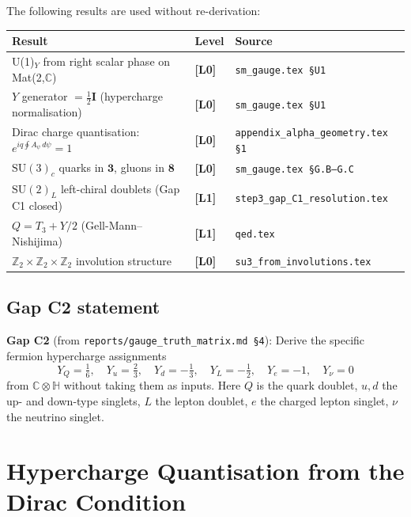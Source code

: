 \documentclass[12pt,a4paper]{article}
\theoremstyle{definition}
\theoremstyle{remark}
\newcommand{\Lzero}{\textbf{[L0]}}
\newcommand{\Lone}{\textbf{[L1]}}
\newcommand{\CC}{\mathbb{C}}
\newcommand{\HH}{\mathbb{H}}
\newcommand{\ZZ}{\mathbb{Z}}
\begin{document}
The following results are used without re-derivation:

\begin{tcolorbox}[colback=green!5!white,colframe=green!50!black,
  title={Pre-Proved Results}]
\begin{center}
\begin{tabular}{lll}
\toprule
\textbf{Result} & \textbf{Level} & \textbf{Source} \\
\midrule
U(1)$_Y$ from right scalar phase on Mat(2,$\CC$) & \Lzero &
  \texttt{sm\_gauge.tex §U1} \\
$Y$ generator $= \frac{1}{2}\mathbf{I}$ (hypercharge normalisation) & \Lzero &
  \texttt{sm\_gauge.tex §U1} \\
Dirac charge quantisation: $e^{iq\oint A_\psi\,d\psi} = 1$ & \Lzero &
  \texttt{appendix\_alpha\_geometry.tex §1} \\
$\mathrm{SU}(3)_c$ quarks in $\mathbf{3}$, gluons in $\mathbf{8}$ & \Lzero &
  \texttt{sm\_gauge.tex §G.B--G.C} \\
$\mathrm{SU}(2)_L$ left-chiral doublets (Gap C1 closed) & \Lone &
  \texttt{step3\_gap\_C1\_resolution.tex} \\
$Q = T_3 + Y/2$ (Gell-Mann--Nishijima) & \Lone &
  \texttt{qed.tex} \\
$\ZZ_2\times\ZZ_2\times\ZZ_2$ involution structure & \Lzero &
  \texttt{su3\_from\_involutions.tex} \\
\bottomrule
\end{tabular}
\end{center}
\end{tcolorbox}

\subsection{Gap C2 statement}

\textbf{Gap C2} (from \texttt{reports/gauge\_truth\_matrix.md §4}):
Derive the specific fermion hypercharge assignments
\[
  Y_Q = \tfrac{1}{6},\quad
  Y_u = \tfrac{2}{3},\quad
  Y_d = -\tfrac{1}{3},\quad
  Y_L = -\tfrac{1}{2},\quad
  Y_e = -1,\quad
  Y_\nu = 0
\]
from $\CC\otimes\HH$ without taking them as inputs.  Here $Q$ is the
quark doublet, $u,d$ the up- and down-type singlets, $L$ the lepton doublet,
$e$ the charged lepton singlet, $\nu$ the neutrino singlet.

\section{Hypercharge Quantisation from the Dirac Condition}
\label{sec:dirac}
\end{document}
